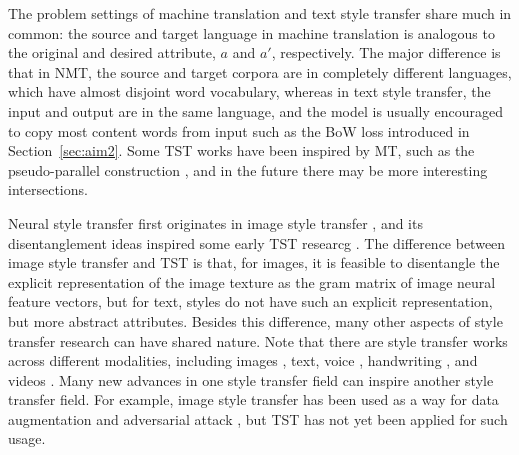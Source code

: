 The problem settings of machine translation and text style transfer share much in common: the source and target language in machine translation is analogous to the original and desired attribute, $a$ and $a'$, respectively. The major difference is that in NMT, the source and target corpora are in completely different languages, which have almost disjoint word vocabulary, whereas in text style transfer, the input and output are in the same language, and the model is usually encouraged to copy most content words from input such as the BoW loss introduced in Section~\ref{sec:aim2}. Some TST works have been inspired by MT, such as the pseudo-parallel construction , and in the future there may be more interesting intersections.

Neural style transfer first originates in image style transfer , and its disentanglement ideas inspired some early TST researcg . The difference between image style transfer and TST is that, for images, it is feasible to disentangle the explicit representation of the image texture as the gram matrix of image neural feature vectors, but for text, styles do not have such an explicit representation, but more abstract attributes. Besides this difference, many other aspects of style transfer research can have shared nature. Note that there are style transfer works across different modalities, including images , text, voice , handwriting , and videos .
Many new advances in one style transfer field can inspire another style transfer field. For example, image style transfer has been used as a way for data augmentation  and adversarial attack , but TST has not yet been applied for such usage.

